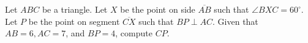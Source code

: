 Let $A B C$ be a triangle. Let $X$ be the point on side $\overline{A B}$ such that $\angle B X C=60^{\circ}$. Let $P$ be the point on segment $\overline{C X}$ such that $B P \perp A C$. Given that $A B=6, A C=7$, and $B P=4$, compute $C P$.